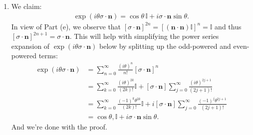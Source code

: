 \documentclass{article}
\theoremstyle{definition}
\newcommand{\f}[2]{\frac{#1}{#2}}
\newcommand{\lp}{\left(}
\newcommand{\rp}{\right)}
\newcommand{\lb}{\left[}
\newcommand{\rb}{\right]}
\begin{document}
\begin{enumerate}[label = (\alph*)]
	\item We claim: 
	\begin{align*}
	\exp\lp i\theta \sigma \cdot \mathbf{n} \rp = \cos\theta \, \mathbb{I} + i\sigma \cdot \mathbf{n}\sin\theta.
	\end{align*}
	In view of Part (e), we observe that $[\sigma \cdot \mathbf{n}]^{2n} = [(\mathbf{n}\cdot \mathbf{n}) \mathbb{I}]^n = \mathbb{I}$ and thus $[\sigma \cdot \mathbf{n}]^{2n+1} = \sigma \cdot \mathbf{n}$. This will help with simplifying the power series expansion of $\exp(i\theta\sigma \cdot \mathbf{n})$ below by splitting up the odd-powered and even-powered terms:
	\begin{align*}
	\exp\lp i\theta \sigma \cdot \mathbf{n} \rp
	&= \sum_{n=0}^\infty \f{(i\theta)^n}{n!} \lb  \sigma \cdot \mathbf{n} \rb^n \\
	&= \sum_{k=0}^\infty \f{(i\theta)^{2k}}{(2k)!} \mathbb{I} +  [\sigma \cdot \mathbf{n}] \sum_{j=0}^{\infty} \f{(i\theta)^{2j+1}}{(2j+1)!}\\
	&= \sum_{k=0}^\infty \f{(-1)^k\theta^{2k}}{(2k)!} \mathbb{I} +  i[\sigma \cdot \mathbf{n}] \sum_{j=0}^{\infty} \f{(-1)^{j}\theta^{2j+1}}{(2j+1)!}\\
	&= \cos\theta, \mathbb{I} +   i\sigma \cdot \mathbf{n}\sin\theta.
	\end{align*}
	And we're done with the proof. 
	
\end{enumerate}
\end{document}
